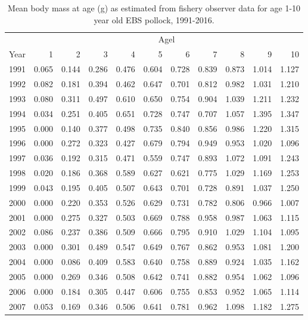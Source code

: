 \documentclass[]{article}
\begin{document}
\begin{table}[ht]
\centering
\caption{Mean body mass at age (g) as estimated from fishery observer data for age 1-10 year old EBS pollock, 1991-2016.} 
\begin{tabular}{lrrrrrrrrrr}
  \hline
     & \multicolumn{10}{c}{Agel} \\
Year & 1 & 2 & 3 & 4 & 5 & 6 & 7 & 8 & 9 & 10 \\ 
  \hline
1991 & 0.065 & 0.144 & 0.286 & 0.476 & 0.604 & 0.728 & 0.839 & 0.873 & 1.014 & 1.127 \\ 
  1992 & 0.082 & 0.181 & 0.394 & 0.462 & 0.647 & 0.701 & 0.812 & 0.982 & 1.031 & 1.210 \\ 
  1993 & 0.080 & 0.311 & 0.497 & 0.610 & 0.650 & 0.754 & 0.904 & 1.039 & 1.211 & 1.232 \\ 
  1994 & 0.034 & 0.251 & 0.405 & 0.651 & 0.728 & 0.747 & 0.707 & 1.057 & 1.395 & 1.347 \\ 
  1995 & 0.000 & 0.140 & 0.377 & 0.498 & 0.735 & 0.840 & 0.856 & 0.986 & 1.220 & 1.315 \\ 
  1996 & 0.000 & 0.272 & 0.323 & 0.427 & 0.679 & 0.794 & 0.949 & 0.953 & 1.020 & 1.096 \\ 
  1997 & 0.036 & 0.192 & 0.315 & 0.471 & 0.559 & 0.747 & 0.893 & 1.072 & 1.091 & 1.243 \\ 
  1998 & 0.020 & 0.186 & 0.368 & 0.589 & 0.627 & 0.621 & 0.775 & 1.029 & 1.169 & 1.253 \\ 
  1999 & 0.043 & 0.195 & 0.405 & 0.507 & 0.643 & 0.701 & 0.728 & 0.891 & 1.037 & 1.250 \\ 
  2000 & 0.000 & 0.220 & 0.353 & 0.526 & 0.629 & 0.731 & 0.782 & 0.806 & 0.966 & 1.007 \\ 
  2001 & 0.000 & 0.275 & 0.327 & 0.503 & 0.669 & 0.788 & 0.958 & 0.987 & 1.063 & 1.115 \\ 
  2002 & 0.086 & 0.237 & 0.386 & 0.509 & 0.666 & 0.795 & 0.910 & 1.029 & 1.104 & 1.095 \\ 
  2003 & 0.000 & 0.301 & 0.489 & 0.547 & 0.649 & 0.767 & 0.862 & 0.953 & 1.081 & 1.200 \\ 
  2004 & 0.000 & 0.086 & 0.409 & 0.583 & 0.640 & 0.758 & 0.889 & 0.924 & 1.035 & 1.162 \\ 
  2005 & 0.000 & 0.269 & 0.346 & 0.508 & 0.642 & 0.741 & 0.882 & 0.954 & 1.062 & 1.096 \\ 
  2006 & 0.000 & 0.184 & 0.305 & 0.447 & 0.606 & 0.755 & 0.853 & 0.952 & 1.065 & 1.114 \\ 
  2007 & 0.053 & 0.169 & 0.346 & 0.506 & 0.641 & 0.781 & 0.962 & 1.098 & 1.182 & 1.275 \\ 

\end{tabular}
\end{table}
\end{document}
